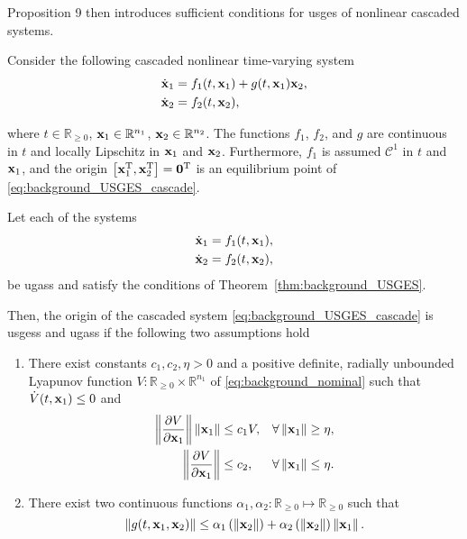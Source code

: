 Proposition 9 then introduces sufficient conditions for \acrfull{usges} of nonlinear cascaded systems.
\begin{prop}
    \label{prop:background_cascade}
    Consider the following cascaded nonlinear time-varying system
    \begin{subequations}
        \begin{align}
            \dot{\mathbf{x}}_1 &= f_1(t, \mathbf{x}_1) + g(t, \mathbf{x}_1)\mathbf{x}_2, \\
            \dot{\mathbf{x}}_2 &= f_2(t, \mathbf{x}_2),
        \end{align}
        \label{eq:background_USGES_cascade}
    \end{subequations}

    \noindent where $t \in \mathbb{R}_{\geq 0}$, $\mathbf{x}_1 \in \mathbb{R}^{n_1}$, $\mathbf{x}_2 \in \mathbb{R}^{n_2}$.
    The functions $f_1$, $f_2$, and $g$ are continuous in $t$ and locally Lipschitz in $\mathbf{x}_1$ and $\mathbf{x}_2$.
    Furthermore, $f_1$ is assumed $\mathcal{C}^1$ in $t$ and $\mathbf{x}_1$, and the origin $\left[\mathbf{x}_1^{\mathrm{T}}, \mathbf{x}_2^{\mathrm{T}}\right] = \mathbf{0}^{\mathrm{T}}$ is an equilibrium point of \eqref{eq:background_USGES_cascade}.

    Let each of the systems
    \begin{align}
        \dot{\mathbf{x}}_1 &= f_1(t, \mathbf{x}_1), \label{eq:background_nominal} \\
        \dot{\mathbf{x}}_2 &= f_2(t, \mathbf{x}_2), 
    \end{align}
    be \glspl{ugas} and satisfy the conditions of Theorem~\ref{thm:background_USGES}.

    Then, the origin of the cascaded system \eqref{eq:background_USGES_cascade} is \glspl{usges} and \glspl{ugas} if the following two assumptions hold
    \begin{enumerate}
        \item There exist constants $c_1, c_2, \eta > 0$ and a positive definite, radially unbounded Lyapunov function $V : \mathbb{R}_{\geq 0} \times \mathbb{R}^{n_1}$ of \eqref{eq:background_nominal} such that $\dot{V}(t, \mathbf{x}_1) \leq 0$ and
        \begin{subequations}
            \begin{align}
                \left\|\frac{\partial V}{\partial \mathbf{x}_1}\right\| \left\|\mathbf{x}_1\right\| &\leq c_1 V,& \forall&\left\|\mathbf{x}_1\right\| \geq \eta, \\
                \left\|\frac{\partial V}{\partial \mathbf{x}_1}\right\| &\leq c_2,& \forall&\left\|\mathbf{x}_1\right\| \leq \eta.
            \end{align}
        \end{subequations}
        \item There exist two continuous functions $\alpha_1, \alpha_2: \mathbb{R}_{\geq 0} \mapsto \mathbb{R}_{\geq 0}$ such that
        \begin{equation}
            \left\|g(t, \mathbf{x}_1, \mathbf{x}_2)\right\| \leq \alpha_1 \left(\left\|\mathbf{x}_2\right\|\right) + \alpha_2 \left(\left\|\mathbf{x}_2\right\|\right) \left\|\mathbf{x}_1\right\|.
            \label{eq:background_USGES_cascade_assumption_2}
        \end{equation}
    \end{enumerate}
\end{prop}
